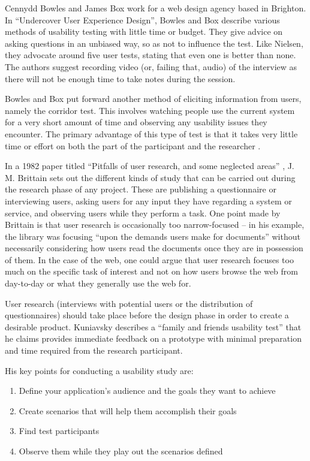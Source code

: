 \documentclass[draft]{scrartcl}
\begin{document}
Cennydd Bowles and James Box work for a web design agency based in Brighton.
In ``Undercover User Experience Design'', Bowles and Box describe various
methods of usability testing with little time or budget. They give advice on
asking questions in an unbiased way, so as not to influence the test. Like
Nielsen, they advocate around five user tests, stating that even one is better
than none. The authors suggest recording video (or, failing that, audio) of
the interview as there will not be enough time to take notes during the
session.

Bowles and Box put forward another method of eliciting information from users,
namely the corridor test. This involves watching people use the current system
for a very short amount of time and observing any usability issues they
encounter. The primary advantage of this type of test is that it takes very
little time or effort on both the part of the participant and the researcher
\cite{bowles2011undercover}.

In a 1982 paper titled ``Pitfalls of user research, and some neglected areas''
\cite{brittain1982pitfalls}, J. M. Brittain sets out the different kinds of
study that can be carried out during the research phase of any project. These
are publishing a questionnaire or interviewing users, asking users for any
input they have regarding a system or service, and observing users while they
perform a task. One point made by Brittain is that user research is
occasionally too narrow-focused -- in his example, the library was focusing
``upon the demands users make for documents'' without necessarily considering
how users read the documents once they are in possession of them. In the case
of the web, one could argue that user research focuses too much on the
specific task of interest and not on how users browse the web from day-to-day
or what they generally use the web for.

User research (interviews with potential users or the distribution of
questionnaires) should take place before the design phase in order to create a
desirable product. Kuniavsky \cite{kuniavsky2003userexperience} describes a
``family and friends usability test'' that he claims provides immediate
feedback on a prototype with minimal preparation and time required from the
research participant.

His key points for conducting a usability study are:

\begin{enumerate}
  \item Define your application's audience and the goals they want to achieve
  \item Create scenarios that will help them accomplish their goals
  \item Find test participants
  \item Observe them while they play out the scenarios defined
\end{enumerate}
\end{document}
